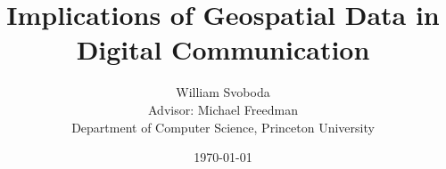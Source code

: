 \documentclass[letterpaper,12pt,twocolumn,twoside,abstract=true]{scrartcl}
\begin{document}
\title{Implications of Geospatial Data in Digital Communication}
\author{William Svoboda\\Advisor: Michael Freedman\\Department of Computer Science, Princeton University}
\date{\monthyeardate\today}

\maketitle











\printbibliography
\end{document}
